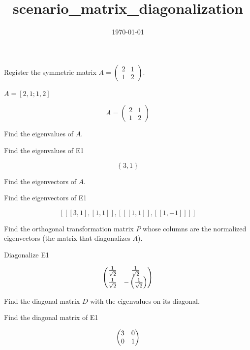 \documentclass[dvipdfmx]{article}
\title{scenario\_matrix\_diagonalization}
\date{\today}
\begin{document}
\maketitle

Register the symmetric matrix $A=\begin{pmatrix}2&1\\1&2\end{pmatrix}$.

$A = [2, 1; 1, 2]$

\begin{equation}
  A = \begin{pmatrix} 2 & 1 \\ 1 & 2 \end{pmatrix}
  \label{eq:E1}
\end{equation}

Find the eigenvalues of $A$.

Find the eigenvalues of E1

\begin{equation}
  \left\{ 3 , 1 \right\}
  \label{eq:E2}
\end{equation}

Find the eigenvectors of $A$.

Find the eigenvectors of E1

\begin{equation}
  \left[ \left[ \left[ 3 , 1 \right]  , \left[ 1 , 1 \right]  \right]  , \left[ \left[ \left[ 1 , 1 \right]  \right]  , \left[ \left[ 1 , -1 \right]  \right]  \right]  \right]
  \label{eq:E3}
\end{equation}

Find the orthogonal transformation matrix $P$ whose columns are the normalized eigenvectors (the matrix that diagonalizes $A$).

Diagonalize E1

\begin{equation}
  \ifx\endpmatrix\undefined\pmatrix{\else\begin{pmatrix}\fi \frac{1}{\sqrt{2}}&\frac{1}{\sqrt{2}}\cr \frac{1}{\sqrt{2}}&-\left(\frac{1}{\sqrt{2}}\right)\cr \ifx\endpmatrix\undefined}\else\end{pmatrix}\fi
  \label{eq:E4}
\end{equation}

Find the diagonal matrix $D$ with the eigenvalues on its diagonal.

Find the diagonal matrix of E1

\begin{equation}
  \ifx\endpmatrix\undefined\pmatrix{\else\begin{pmatrix}\fi 3&0\cr 0&1\cr \ifx\endpmatrix\undefined}\else\end{pmatrix}\fi
  \label{eq:E5}
\end{equation}
\end{document}
